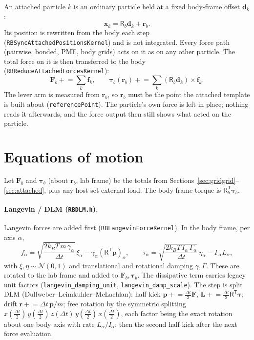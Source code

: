 \documentclass[11pt]{article}
\newcommand{\vb}[1]{\bm{#1}}
\newcommand{\code}[1]{\texttt{#1}}
\begin{document}
An attached particle $k$ is an ordinary particle held at a fixed body-frame
offset $\vb d_k$:
\begin{equation}
  \vb x_k=\mathsf R_b\vb d_k+\vb r_b .
\end{equation}
Its position is rewritten from the body each step
(\code{RBSyncAttachedPositionsKernel}) and is not integrated. Every force path
(pairwise, bonded, PMF, body grids) acts on it as on any other particle. The
total force on it is then transferred to the body
(\code{RBReduceAttachedForcesKernel}):
\begin{equation}
  \vb F_b \mathrel{+}= \sum_k\vb f_k,\qquad
  \vb\tau_b(\vb r_b) \mathrel{+}= \sum_k(\mathsf R_b\vb d_k)\times\vb f_k .
\end{equation}
The lever arm is measured from $\vb r_b$, so $\vb r_b$ must be the point the
attached template is built about (\code{referencePoint}). The particle's own
force is left in place; nothing reads it afterwards, and the force output then
still shows what acted on the particle.

\section{Equations of motion}
\label{sec:eom}

Let $\vb F_b$ and $\vb\tau_b$ (about $\vb r_b$, lab frame) be the totals from
Sections~\ref{sec:gridgrid}--\ref{sec:attached}, plus any host-set external
load. The body-frame torque is $\mathsf R_b^{\mathsf T}\vb\tau_b$.

\paragraph{Langevin / DLM (\code{RBDLM.h}).}
Langevin forces are added first (\code{RBLangevinForceKernel}). In the body
frame, per axis $\alpha$,
\begin{equation}
  f_\alpha = \sqrt{\frac{2k_BT\,m\,\gamma_\alpha}{\Delta t}}\,\xi_\alpha
  - \gamma_\alpha\left(\mathsf R^{\mathsf T}\vb p\right)_\alpha ,
  \qquad
  \tau_\alpha = \sqrt{\frac{2k_BT\,I_\alpha\,\Gamma_\alpha}{\Delta t}}\,\eta_\alpha
  - \Gamma_\alpha L_\alpha ,
\end{equation}
with $\xi,\eta\sim\mathcal N(0,1)$ and translational and rotational damping
$\gamma,\Gamma$. These are rotated to the lab frame and added to
$\vb F_b,\vb\tau_b$. The dissipative term carries legacy unit factors
(\code{langevin\_damping\_unit}, \code{langevin\_damp\_scale}). The step is
split DLM (Dullweber--Leimkuhler--McLachlan): half kick
$\vb p\mathrel{+}=\tfrac{\Delta t}{2}\vb F$,
$\vb L\mathrel{+}=\tfrac{\Delta t}{2}\mathsf R^{\mathsf T}\vb\tau$; drift
$\vb r\mathrel{+}=\Delta t\,\vb p/m$; free rotation by the symmetric splitting
$x(\tfrac{\Delta t}{2})\,y(\tfrac{\Delta t}{2})\,z(\Delta t)\,y(\tfrac{\Delta t}{2})\,x(\tfrac{\Delta t}{2})$,
each factor being the exact rotation about one body axis with rate
$L_\alpha/I_\alpha$; then the second half kick after the next force
evaluation.
\end{document}
